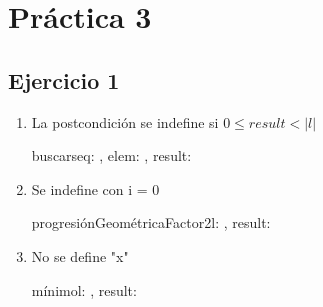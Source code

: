 
\usepackage{caratula}
\usepackage{enumerate}
\usepackage{hyperref}
\usepackage{graphicx}
\usepackage{amsfonts}
\usepackage{enumitem}

\decimalpoint
\hypersetup{colorlinks=true, linkcolor=black, urlcolor=blue}
\setlength{\parindent}{0em}
\setlength{\parskip}{0.5em}
\setcounter{tocdepth}{2} %
\setcounter{section}{2} %
\renewcommand{\thesubsubsection}{\thesubsection.\Alph{subsubsection}}
\graphicspath{ {images/} }





\maketitle
\newpage

\tableofcontents
\newpage


\section{Práctica 3}

\subsection{Ejercicio 1}

\begin{enumerate}[label=(\alph*)]
    \item La postcondición se indefine si $0 \leq result < |l|$ \
        \begin{proc}{buscar}{\In seq: \TLista{\ent}, \In elem: \float, \Out result: \ent}{}
        \pre{elem \in \float}
        \end{proc}
    \item Se indefine con i = 0
        \begin{proc}{progresiónGeométricaFactor2}{\In l: \TLista{\ent}, \Out result: \bool}{}
        \pre{\True}
        \end{proc}
    \item No se define "x"
        \begin{proc}{mínimo}{\In l: \TLista{\ent}, \Out result: \ent}{}
        \pre{\True}
        \end{proc}
\end{enumerate}


